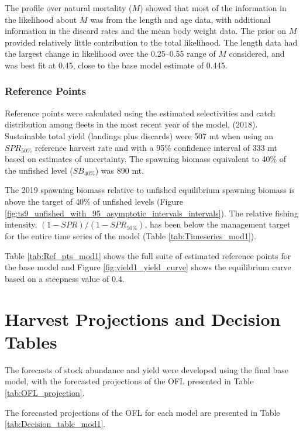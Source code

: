 \documentclass[12pt,]{article}
\begin{document}
The profile over natural mortality (\(M\)) showed that most of the
information in the likelihood about \(M\) was from the length and age
data, with additional information in the discard rates and the mean body
weight data. The prior on \(M\) provided relatively little contribution
to the total likelihood. The length data had the largest change in
likelihood over the 0.25--0.55 range of \(M\) considered, and was best
fit at 0.45, close to the base model estimate of 0.445.

\hypertarget{reference-points-1}{%
\subsubsection{Reference Points}\label{reference-points-1}}

Reference points were calculated using the estimated selectivities and
catch distribution among fleets in the most recent year of the model,
(2018). Sustainable total yield (landings plus discards) were 507 mt
when using an \(SPR_{50\%}\) reference harvest rate and with a 95\%
confidence interval of 333 mt based on estimates of uncertainty. The
spawning biomass equivalent to 40\% of the unfished level
(\(SB_{40\%}\)) was 890 mt.

The 2019 spawning biomass relative to unfished equilibrium spawning
biomass is above the target of 40\% of unfished levels (Figure
\ref{fig:ts9_unfished_with_95_asymptotic_intervals_intervals}). The
relative fishing intensity, \((1-SPR)/(1-SPR_{50\%})\), has been below
the management target for the entire time series of the model (Table
\ref{tab:Timeseries_mod1}).

Table \ref{tab:Ref_pts_mod1} shows the full suite of estimated reference
points for the base model and Figure \ref{fig:yield1_yield_curve} shows
the equilibrium curve based on a steepness value of 0.4.

\newpage

\hypertarget{harvest-projections-and-decision-tables}{%
\section{Harvest Projections and Decision
Tables}\label{harvest-projections-and-decision-tables}}

The forecasts of stock abundance and yield were developed using the
final base model, with the forecasted projections of the OFL presented
in Table \ref{tab:OFL_projection}.

The forecasted projections of the OFL for each model are presented in
Table \ref{tab:Decision_table_mod1}.
\end{document}
